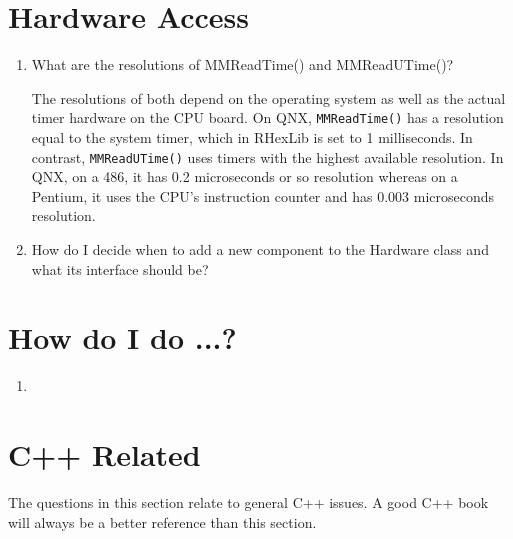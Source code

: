\section{Hardware Access}

\begin{enumerate}

\item{What are the resolutions of MMReadTime() and MMReadUTime()?}\par
The resolutions of both depend on the operating system as well as the
actual timer hardware on the CPU board. On QNX, {\tt MMReadTime()} has a
resolution equal to the system timer, which in RHexLib is set to 1
milliseconds. In contrast, {\tt MMReadUTime()} uses timers with the highest
available resolution. In QNX, on a 486, it has 0.2 microseconds or so
resolution whereas on a Pentium, it uses the CPU's instruction counter and
has 0.003 microseconds resolution.

\item{How do I decide when to add a new component to the Hardware class and
    what its interface should be?}\par
\end{enumerate}

\section{How do I do ...?}

\begin{enumerate}
\item
\end{enumerate}

\section{C++ Related}

The questions in this section relate to general C++ issues. A good C++ book
will always be a better reference than this section.

